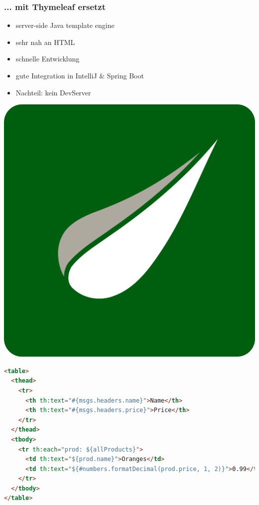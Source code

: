 \begin{frame}
\frametitle{... mit Thymeleaf ersetzt}
\begin{minipage}{0.5\textwidth}
\begin{itemize}
\item server-side Java template engine
\item sehr nah an HTML
\item schnelle Entwicklung 
\item gute Integration in IntelliJ & Spring Boot
\item Nachteil: kein DevServer
\end{itemize}
\end{minipage}
\begin{minipage}{0.4\textwidth}
\begin{center}
\includegraphics[height=0.25\textheight]{thymeleaf}\\[12pt]
\end{center}
\end{minipage}
\end{frame}

\begin{frame}[containsverbatim]
\begin{center}
\begin{lstlisting}[language=HTML]
<table>
  <thead>
    <tr>
      <th th:text="#{msgs.headers.name}">Name</th>
      <th th:text="#{msgs.headers.price}">Price</th>
    </tr>
  </thead>
  <tbody>
    <tr th:each="prod: ${allProducts}">
      <td th:text="${prod.name}">Oranges</td>
      <td th:text="${#numbers.formatDecimal(prod.price, 1, 2)}">0.99</td>
    </tr>
  </tbody>
</table>
\end{lstlisting}
\end{center}
\end{frame}

